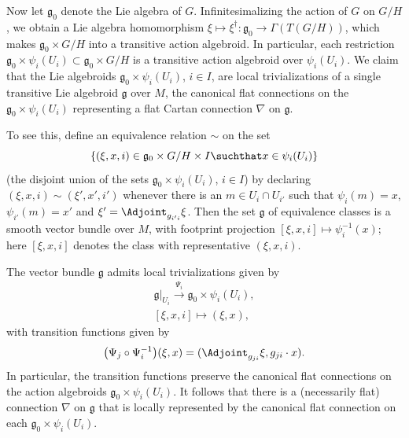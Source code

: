 Now let ${\mathfrak g}_0$ denote the Lie algebra of
$G$. Inf\/initesimalizing the action of $G$ on $G/H$, we obtain a Lie
algebra homomorphism $\xi \mapsto \xi^\dagger \colon {\mathfrak g}_0
\rightarrow \Gamma(T(G/H)) $, which makes ${\mathfrak g}_0 \times G/H$
into a transitive action algebroid. In particular, each restriction
${\mathfrak g}_0 \times \psi_i(U_i) \subset {\mathfrak g}_0 \times
G/H$ is a transitive action algebroid over $\psi_i(U_i)$. We claim
that the Lie algebroids ${\mathfrak g}_0 \times \psi_i(U_i) $, $i \in
I$, are local trivializations of a single transitive Lie algebroid
${\mathfrak g} $ over $M$, the canonical f\/lat connections on the
${\mathfrak g}_0 \times \psi_i(U_i)$ representing a f\/lat Cartan
connection $\nabla $ on $\mathfrak g$.

To see this, def\/ine an equivalence relation $\sim$ on the
set
\[
\{(\xi,x,i) \in {\mathfrak g}_0 \times G/H \times I\suchthat x
\in \psi_i(U_i)\}
\] (the disjoint union of the sets ${\mathfrak g}_0
\times \psi_i(U_i)$, $i\in I$) by declaring
$(\xi,x,i)\sim(\xi',x',i')$ whenever there is an $m\in U_i\cap U_{i'}$
such that $\psi_i(m)=x$, $\psi_{i'}(m)=x'$ and
$\xi'=\Adjoint_{g_{i'i}}\xi$. Then the set ${\mathfrak g}$ of
equivalence classes is a smooth vector bundle over $M$, with footprint
projection $[\xi,x,i]\mapsto \psi_i^{-1}(x)$; here $[\xi,x, i]$
denotes the class with representative $(\xi,x,i)$.

The vector bundle $\mathfrak g$ admits local trivializations given by
\begin{gather*}
  {\mathfrak g}|_{U_i} \xrightarrow{\Psi_i}{\mathfrak g}_0 \times \psi_i(U_i), \\
  [\xi,x,i] \mapsto (\xi,x),
\end{gather*}
with transition functions given by
\begin{gather*}
  \big(\Psi_j \circ
  \Psi_i^{-1}\big)(\xi,x)=(\Adjoint_{g_{ji}}\xi,g_{ji}\cdot x).%
\end{gather*}
In particular, the transition functions preserve the canonical f\/lat
connections on the action algebroids ${\mathfrak g}_0 \times
\psi_i(U_i)$. It follows that there is a (necessarily f\/lat) connection
$\nabla$ on $\mathfrak g$ that is locally represented by the canonical
f\/lat connection on each ${\mathfrak g}_0 \times \psi_i(U_i)$.

